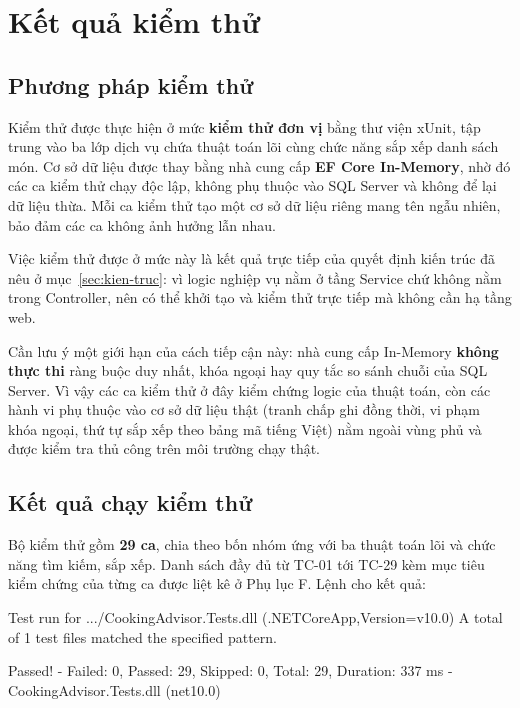 \section{Kết quả kiểm thử}
\label{sec:kiem-thu}

\subsection{Phương pháp kiểm thử}

Kiểm thử được thực hiện ở mức \textbf{kiểm thử đơn vị} bằng thư viện xUnit, tập
trung vào ba lớp dịch vụ chứa thuật toán lõi cùng chức năng sắp xếp danh sách
món. Cơ sở dữ liệu được thay bằng nhà cung cấp \textbf{EF Core In-Memory}, nhờ đó
các ca kiểm thử chạy độc lập, không phụ thuộc vào SQL Server và không để lại dữ
liệu thừa. Mỗi ca kiểm thử tạo một cơ sở dữ liệu riêng mang tên ngẫu nhiên, bảo
đảm các ca không ảnh hưởng lẫn nhau.

Việc kiểm thử được ở mức này là kết quả trực tiếp của quyết định kiến trúc đã nêu
ở mục~\ref{sec:kien-truc}: vì logic nghiệp vụ nằm ở tầng Service chứ không nằm
trong Controller, nên có thể khởi tạo và kiểm thử trực tiếp mà không cần hạ tầng
web.

Cần lưu ý một giới hạn của cách tiếp cận này: nhà cung cấp In-Memory
\textbf{không thực thi} ràng buộc duy nhất, khóa ngoại hay quy tắc so sánh chuỗi
của SQL Server. Vì vậy các ca kiểm thử ở đây kiểm chứng logic của thuật toán, còn
các hành vi phụ thuộc vào cơ sở dữ liệu thật (tranh chấp ghi đồng thời, vi phạm
khóa ngoại, thứ tự sắp xếp theo bảng mã tiếng Việt) nằm ngoài vùng phủ và được
kiểm tra thủ công trên môi trường chạy thật.

\subsection{Kết quả chạy kiểm thử}

Bộ kiểm thử gồm \textbf{29 ca}, chia theo bốn nhóm ứng với ba thuật toán lõi và
chức năng tìm kiếm, sắp xếp. Danh sách đầy đủ từ TC-01 tới TC-29 kèm mục tiêu
kiểm chứng của từng ca được liệt kê ở Phụ lục F. Lệnh
 cho kết quả:

\begin{codeblock}
Test run for .../CookingAdvisor.Tests.dll
    (.NETCoreApp,Version=v10.0)
A total of 1 test files matched the specified pattern.

Passed!  - Failed: 0, Passed: 29, Skipped: 0, Total: 29,
Duration: 337 ms - CookingAdvisor.Tests.dll (net10.0)
\end{codeblock}

